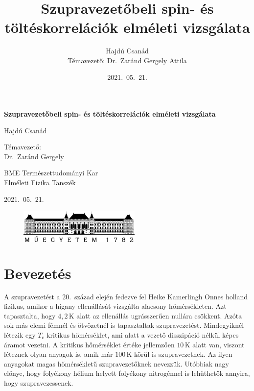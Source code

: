\documentclass[a4paper,12pt,titlepage]{article}
\title{\bf Szupravezetőbeli spin- és töltéskorrelációk elméleti vizsgálata}
\author{Hajdú Csanád \\ \small Témavezető: Dr.\ Zaránd Gergely Attila}
\date{2021.\ 05.\ 21.}
\begin{document}
\begin{titlepage}
\begin{center}
	\vspace*{1cm}
	\textbf{\huge Szupravezetőbeli spin- és töltéskorrelációk elméleti vizsgálata}

	\vspace{3.5cm}

	\Large
	Hajdú Csanád

	\vspace{2.5cm}
	{\normalsize Témavezető:} \\
	Dr.\ Zaránd Gergely

	\vfill

	BME Természettudományi Kar \\
	Elméleti Fizika Tanszék

	\vspace{1.5cm}

	2021.\ 05.\ 21.

	\begin{figure}[b]
		\centering
		\includegraphics[width=6cm]{bme-logo.png}
	\end{figure}
\end{center}
\end{titlepage}

\tableofcontents \newpage


\section{Bevezetés}

A szupravezetést a 20.\ század elején fedezve fel Heike Kamerlingh Onnes holland fizikus, amikor a higany ellenállását vizsgálta alacsony hőmérsékleten.  Azt tapasztalta, hogy $4,2$\,K alatt az ellenállás ugrásszerűen nullára csökkent.  Azóta sok más elemi fémnél és ötvözetnél is tapasztaltak szupravezetést.  Mindegyiknél létezik egy $T_\text{c}$ kritikus hőmérséklet, ami alatt a vezető disszipáció nélkül képes áramot vezetni.  A kritikus hőmérséklet értéke jellemzően $10$\,K alatt van, viszont léteznek olyan anyagok is, amik már $100$\,K körül is szupravezetnek.  Az ilyen anyagokat magas hőmérsékletű szupravezetőknek nevezzük.  Utóbbiak nagy előnye, hogy folyékony hélium helyett folyékony nitrogénnel is lehűthetők annyira, hogy szupravezessenek.
\end{document}
